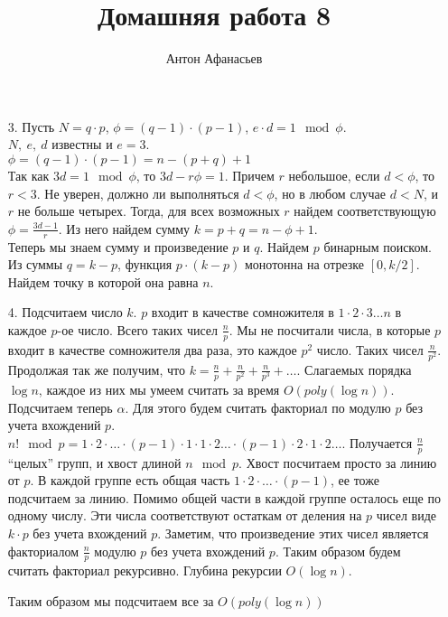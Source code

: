 \documentclass[10pt]{article}
\begin{document}
\title{Домашняя работа 8}
\author{Антон Афанасьев}
\maketitle

\begin{enumerate}
	\item[3.] Пусть $N = q \cdot p$, $\phi = (q-1) \cdot (p-1)$, $e \cdot d = 1\mod \phi$. \\
	$N,\ e,\ d$ известны и $e=3$.\\
	$\phi = (q-1) \cdot (p-1) = n - (p+q) +1$\\
	Так как $3d = 1 \mod \phi$, то $3d - r \phi = 1$. Причем $r$ небольшое, если $d < \phi$, то $r < 3$. Не уверен, должно ли выполняться $d < \phi$, но в любом случае $d < N$, и $r$ не больше четырех. Тогда, для всех возможных $r$ найдем соответствующую $\phi = \frac{3d - 1}{r}$. Из него найдем сумму $k = p + q = n - \phi + 1$.\\
	Теперь мы знаем сумму и произведение $p$ и $q$. Найдем $p$ бинарным поиском. Из суммы $q = k- p$, функция $p \cdot (k-p)$ монотонна на отрезке $[0, k/2]$. Найдем точку в которой она равна $n$.
	
	\item[4.]  Подсчитаем число $k$. $p$ входит в качестве сомножителя в $1 \cdot 2 \cdot 3 \ldots n$ в каждое $p$-ое число. Всего таких чисел $\frac{n}{p}$. Мы не посчитали числа, в которые $p$ входит в качестве сомножителя два раза, это каждое $p^2$ число. Таких чисел $\frac{n}{p^2}$. Продолжая так же получим, что $k = \frac{n}{p} + \frac{n}{p^2} + \frac{n}{p^3} + \ldots$. Слагаемых порядка $\log n$, каждое из них мы умеем считать за время $O(poly(\log n))$.
	Подсчитаем теперь $\alpha$. Для этого будем считать факториал по модулю $p$ без учета вхождений $p$. $n! \mod p = 1 \cdot 2 \cdot \ldots \cdot (p-1) \cdot 1 \cdot 1 \cdot 2 \ldots \cdot (p-1) \cdot 2 \cdot 1 \cdot 2 \ldots$. Получается $\frac{n}{p}$ ``целых'' групп, и хвост длиной $n \mod p$. Хвост посчитаем просто за линию от $p$. В каждой группе есть общая часть $1 \cdot 2 \cdot \ldots \cdot (p-1)$, ее тоже подсчитаем за линию. Помимо общей части в каждой группе осталось еще по одному числу. Эти числа соответствуют остаткам от деления на $p$ чисел виде $k \cdot p$ без учета вхождений $p$. Заметим, что произведение этих чисел является факториалом $\frac{n}{p}$ модулю $p$ без учета вхождений $p$. Таким образом будем считать факториал рекурсивно. Глубина рекурсии $O(\log n)$.
	
	Таким образом мы подсчитаем все за $O(poly(\log n))$
\end{enumerate}
\end{document}
